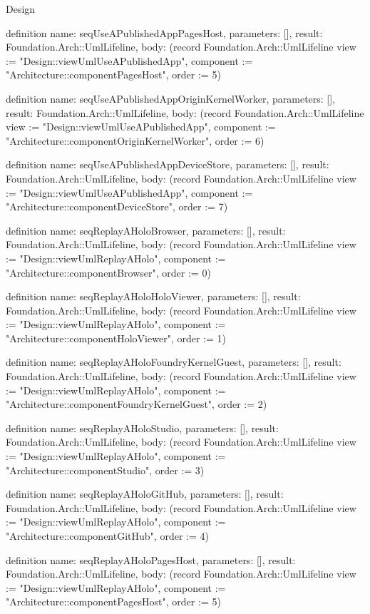 \begin{lexlean}{Design}
\begin{semanticmodule}
definition{
  name: seqUseAPublishedAppPagesHost,
  parameters: [],
  result: Foundation.Arch::UmlLifeline,
  body: (record Foundation.Arch::UmlLifeline {view := "Design::viewUmlUseAPublishedApp", component := "Architecture::componentPagesHost", order := 5})
}

definition{
  name: seqUseAPublishedAppOriginKernelWorker,
  parameters: [],
  result: Foundation.Arch::UmlLifeline,
  body: (record Foundation.Arch::UmlLifeline {view := "Design::viewUmlUseAPublishedApp", component := "Architecture::componentOriginKernelWorker", order := 6})
}

definition{
  name: seqUseAPublishedAppDeviceStore,
  parameters: [],
  result: Foundation.Arch::UmlLifeline,
  body: (record Foundation.Arch::UmlLifeline {view := "Design::viewUmlUseAPublishedApp", component := "Architecture::componentDeviceStore", order := 7})
}

definition{
  name: seqReplayAHoloBrowser,
  parameters: [],
  result: Foundation.Arch::UmlLifeline,
  body: (record Foundation.Arch::UmlLifeline {view := "Design::viewUmlReplayAHolo", component := "Architecture::componentBrowser", order := 0})
}

definition{
  name: seqReplayAHoloHoloViewer,
  parameters: [],
  result: Foundation.Arch::UmlLifeline,
  body: (record Foundation.Arch::UmlLifeline {view := "Design::viewUmlReplayAHolo", component := "Architecture::componentHoloViewer", order := 1})
}

definition{
  name: seqReplayAHoloFoundryKernelGuest,
  parameters: [],
  result: Foundation.Arch::UmlLifeline,
  body: (record Foundation.Arch::UmlLifeline {view := "Design::viewUmlReplayAHolo", component := "Architecture::componentFoundryKernelGuest", order := 2})
}

definition{
  name: seqReplayAHoloStudio,
  parameters: [],
  result: Foundation.Arch::UmlLifeline,
  body: (record Foundation.Arch::UmlLifeline {view := "Design::viewUmlReplayAHolo", component := "Architecture::componentStudio", order := 3})
}

definition{
  name: seqReplayAHoloGitHub,
  parameters: [],
  result: Foundation.Arch::UmlLifeline,
  body: (record Foundation.Arch::UmlLifeline {view := "Design::viewUmlReplayAHolo", component := "Architecture::componentGitHub", order := 4})
}

definition{
  name: seqReplayAHoloPagesHost,
  parameters: [],
  result: Foundation.Arch::UmlLifeline,
  body: (record Foundation.Arch::UmlLifeline {view := "Design::viewUmlReplayAHolo", component := "Architecture::componentPagesHost", order := 5})
}


\end{semanticmodule}
\end{lexlean}
